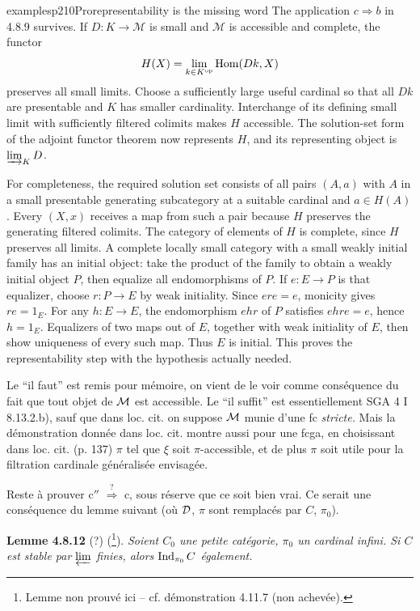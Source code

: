 \begin{dcomment}{examples}{p210}{Prorepresentability is the missing word}
The application $c\Rightarrow b$ in 4.8.9 survives. If $D:K\to\mathcal M$ is small and $\mathcal M$ is accessible and complete, the functor
\[
 H(X)=\lim_{k\in K^{\mathrm{op}}}\operatorname{Hom}(Dk,X)
\]
preserves all small limits. Choose a sufficiently large useful cardinal so that all $Dk$ are presentable and $K$ has smaller cardinality. Interchange of its defining small limit with sufficiently filtered colimits makes $H$ accessible. The solution-set form of the adjoint functor theorem now represents $H$, and its representing object is $\varinjlim_KD$.

For completeness, the required solution set consists of all pairs $(A,a)$ with $A$ in a small presentable generating subcategory at a suitable cardinal and $a\in H(A)$. Every $(X,x)$ receives a map from such a pair because $H$ preserves the generating filtered colimits. The category of elements of $H$ is complete, since $H$ preserves all limits. A complete locally small category with a small weakly initial family has an initial object: take the product of the family to obtain a weakly initial object $P$, then equalize all endomorphisms of $P$. If $e:E\to P$ is that equalizer, choose $r:P\to E$ by weak initiality. Since $ere=e$, monicity gives $re=1_E$. For any $h:E\to E$, the endomorphism $ehr$ of $P$ satisfies $ehre=e$, hence $h=1_E$. Equalizers of two maps out of $E$, together with weak initiality of $E$, then show uniqueness of every such map. Thus $E$ is initial. This proves the representability step with the hypothesis actually needed.
\end{dcomment}


Le ``il faut'' est remis pour mémoire, on vient de le voir comme conséquence du fait que tout objet de $\mathcal{M}$ est accessible. Le ``il suffit'' est essentiellement SGA 4 I 8.13.2.b), sauf que dans loc. cit. on suppose $\mathcal{M}$ munie d'une fc \textit{stricte.} Mais la démonstration donnée dans loc. cit. montre aussi pour une fcga, en choisissant dans loc. cit. (p. 137) $\pi$ tel que $\xi$ soit $\pi$-accessible, et de plus $\pi$ soit utile pour la filtration cardinale généralisée envisagée.

Reste à prouver c$''$ $\overset{?}{\Longrightarrow}$ c, sous réserve que ce soit bien vrai. Ce serait une conséquence du lemme suivant (où $\mathcal{D}$, $\pi$ sont remplacés par $C$, $\pi_0$).

\textbf{Lemme 4.8.12} (?) (\footnote[88]{Lemme non prouvé ici -- cf. démonstration 4.11.7 (non achevée).}). \textit{Soient $C_0$ une petite catégorie, $\pi_0$ un cardinal infini. Si $C$ est stable par $\varprojlim$ finies, alors $\operatorname{Ind}_{\pi_0}C$ également.} %

